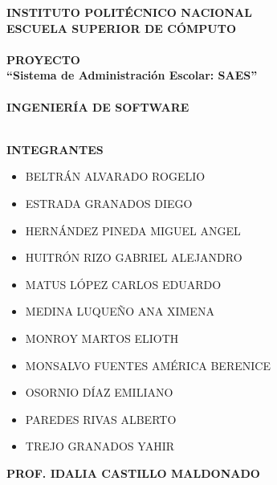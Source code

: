 \newpage
\begin{center}
\thispagestyle{empty}
\LARGE{\textsc {\textbf{INSTITUTO POLITÉCNICO NACIONAL}}}\\[0.5cm]
\Large{\textbf{ESCUELA SUPERIOR DE CÓMPUTO}}\\[0.7cm]
\vspace{0.5cm}
\Large{\textbf{\\PROYECTO}}
\LARGE{\textbf{\\``Sistema de Administración Escolar: SAES''\\}}
\vspace{2cm}
\Large{\textbf{\\INGENIERÍA DE SOFTWARE}}
\vspace{2cm}
\end{center}
\Large{\textbf{\\INTEGRANTES}}\\
\large{
\begin{itemize}
    \item BELTRÁN ALVARADO ROGELIO
    \item ESTRADA GRANADOS DIEGO
    \item HERNÁNDEZ PINEDA MIGUEL ANGEL
    \item HUITRÓN RIZO GABRIEL ALEJANDRO
    \item MATUS LÓPEZ CARLOS EDUARDO
    \item MEDINA LUQUEÑO ANA XIMENA
    \item MONROY MARTOS ELIOTH
    \item MONSALVO FUENTES AMÉRICA BERENICE
    \item OSORNIO DÍAZ EMILIANO
    \item PAREDES RIVAS ALBERTO
    \item TREJO GRANADOS YAHIR
\end{itemize}
}
\vspace*{1cm}
\large{\textbf{PROF. IDALIA CASTILLO MALDONADO}}\\
\newpage